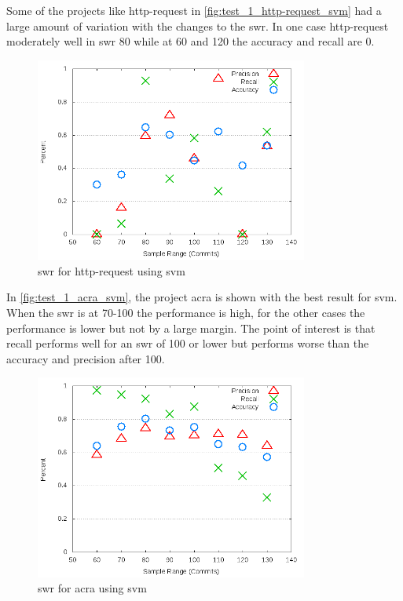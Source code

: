 Some of the projects like http-request in \autoref{fig:test_1_http-request_svm} had a large amount of variation with the changes to the \gls{swr}. In one case http-request moderately well in \gls{swr} 80 while at 60 and 120 the accuracy and recall are $0$.

\begin{figure}[!ht]
    \centering

        \includegraphics[width=0.8\textwidth]{images/svm/test_1/http-request_sample_range}
        \caption{\gls{swr} for http-request using \gls{svm}}
        \label{fig:test_1_http-request_svm}
\end{figure}

In \autoref{fig:test_1_acra_svm}, the project acra is shown with the best result for \gls{svm}. When the \gls{swr} is at 70-100 the performance is high, for the other cases the performance is lower but not by a large margin. The point of interest is that recall performs well for an \gls{swr} of 100 or lower but performs worse than the accuracy and precision after 100.

\begin{figure}[!ht]
    \centering

        \includegraphics[width=0.8\textwidth]{images/svm/test_1/acra_sample_range}
        \caption{\gls{swr} for acra using \gls{svm}}
        \label{fig:test_1_acra_svm}
\end{figure}

